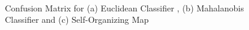 \documentclass[preprint,12pt]{elsarticle}
\begin{document}
\begin{figure}[ht!]
	\begin{center}
		 \\
		\caption{ Confusion Matrix for (a) Euclidean Classifier , (b) Mahalanobis Classifier and (c) Self-Organizing Map}
		\label{fig:CM_C1}
	\end{center}
\end{figure}
\end{document}
